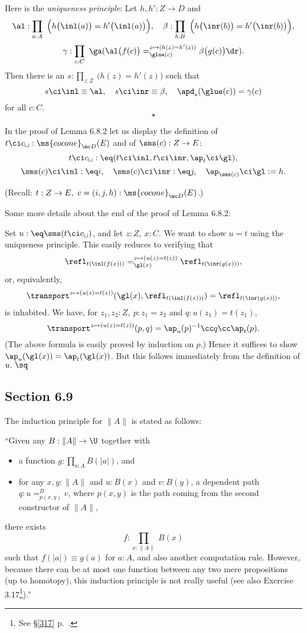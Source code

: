 \documentclass[12pt]{article}
\begin{document}
Here is the \emph{uniqueness principle}: Let $h,h':Z\to D$ and 
$$
\al:\prod_{a:A}\ \Big(h\big(\inl(a)\big)=h'\big(\inl(a)\big)\Big),\quad\beta:\prod_{b:B}\ \Big(h\big(\inr(b)\big)=h'\big(\inr(b)\big)\Big),
$$
$$
\gamma:\prod_{c:C}\ \ga(\al\big(f(c)\big)=^{z\mapsto(h(z)=h'(z))}_{\glue(c)}\beta\big(g(c)\big)\dr).
$$ 
Then there is an $s:\prod_{z:Z}\ \big(h(z)=h'(z)\big)$ such that 
$$
s\ci\inl\equiv\al,\quad s\ci\inr\equiv\beta,\quad\apd_s(\glue(c))=\gamma(c)
$$ 
for all $c:C$.  
$$
\star
$$

In the proof of Lemma 6.8.2 let us display the definition of $t\ci c_{\sqcup}:\ms{cocone}_{\mc D}(E)$ and of $\sms(c):Z\to E$: 
$$
t\ci c_{\sqcup}:\eq(t\ci\inl,t\ci\inr,\ap_t\ci\gl),
$$ 
$$
\sms(c)\ci\inl:\eq i,\quad\sms(c)\ci\inr :\eq j,\quad\ap_{\sms(c)}\ci\gl:=h.
$$ 

\nn(Recall: $t:Z\to E,\ c=(i,j,h):\ms{cocone}_{\mc D}(E)$.)

Some more details about the end of the proof of Lemma 6.8.2:

Set $u:\eq\sms(t\ci c_\sqcup)$, and let $z:Z,\ x:C$. We want to show $u=t$ using the uniqueness principle. This easily reduces to verifying that 
$$
\refl_{t(\inl(f(x)))}=_{\gl(x)}^{z\mapsto(u(z)=t(z))}\refl_{t(\inr(g(x)))},
$$ 
or, equivalently, 
$$
\transport^{z\mapsto(u(z)=t(z))}(\gl(x),\refl_{t(\inl(f(x)))})=\refl_{t(\inr(g(x)))},
$$ 
is inhabited. We have, for $z_1,z_2:Z,\ p:z_1=z_2$ and $q:u(z_1)=t(z_1)$, 
$$
\transport^{z\mapsto(u(z)=t(z))}(p,q)=\ap_u(p)^{-1}\cc q\cc\ap_t(p).
$$ 
(The above formula is easily proved by induction on $p$.) Hence it suffices to show $\ap_u(\gl(x))=\ap_t(\gl(x))$. But this follows immediately from the definition of $u.\ \sq$


\subsection{Section 6.9}\label{69}

The induction principle for $\lVert A\rVert$ is stated as follows:

\nn``Given any $B:\lVert A\rVert\to\U$ together with
\begin{itemize}
\item a function $g:\prod_{a:A}B(\lvert a\rvert)$, and
\item for any $x,y:\lVert A\rVert$ and $u:B(x)$ and $v:B(y)$, a dependent path $q:u=^B_{p(x,y)}v$, where $p(x,y)$ is the path coming from the second constructor of $\lVert A\rVert$,
\end{itemize}
there exists 
$$
f:\prod_{x:\lVert A\rVert}\ B(x)
$$ 
such that $f(\lvert a\rvert)\equiv g(a)$ for $a:A$, and also another computation rule. However, because there can be at most one function between any two mere propositions (up to homotopy), this induction principle is not really useful (see also Exercise 3.17\footnote{See \S\ref{317} p.~\pageref{317}.}).''
\end{document}
